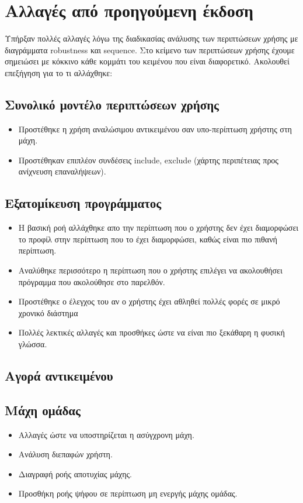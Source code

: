 \section*{Αλλαγές από προηγούμενη έκδοση}
Υπήρξαν πολλές αλλαγές λόγω της διαδικασίας ανάλυσης των περιπτώσεων χρήσης με διαγράμματα robustness και sequence. Στο κείμενο των περιπτώσεων χρήσης έχουμε σημειώσει με κόκκινο κάθε κομμάτι του κειμένου που είναι διαφορετικό. Ακολουθεί επεξήγηση για το τι αλλάχθηκε:
\subsection{Συνολικό μοντέλο περιπτώσεων χρήσης}
\begin{itemize}
\item Προστέθηκε η χρήση αναλώσιμου αντικειμένου σαν υπο-περίπτωση χρήστης στη μάχη.
\item Προστέθηκαν επιπλέον συνδέσεις include, exclude (χάρτης περιπέτειας προς ανίχνευση επαναλήψεων).
\end{itemize}
\subsection{Εξατομίκευση προγράμματος}
\begin{itemize}
    \item Η βασική ροή αλλάχθηκε απο την περίπτωση που ο χρήστης δεν έχει διαμορφώσει το προφίλ στην περίπτωση που το έχει διαμορφώσει, καθώς είναι πιο πιθανή περίπτωση.
    \item Αναλύθηκε περισσότερο η περίπτωση που ο χρήστης επιλέγει να ακολουθήσει πρόγραμμα που ακολούθησε στο παρελθόν.
    \item Προστέθηκε ο έλεγχος του αν ο χρήστης έχει αθληθεί πολλές φορές σε μικρό χρονικό διάστημα
    \item Πολλές λεκτικές αλλαγές και προσθήκες ώστε να είναι πιο ξεκάθαρη η φυσική γλώσσα.
\end{itemize}
\subsection{Αγορά αντικειμένου}
\subsection{Μάχη ομάδας}
\begin{itemize}
    \item Αλλαγές ώστε να υποστηρίζεται η ασύγχρονη μάχη.
    \item Ανάλυση διεπαφών χρήστη.
    \item Διαγραφή ροής αποτυχίας μάχης.
    \item Προσθήκη ροής ψήφου σε περίπτωση μη ενεργής μάχης ομάδας.
\end{itemize}

